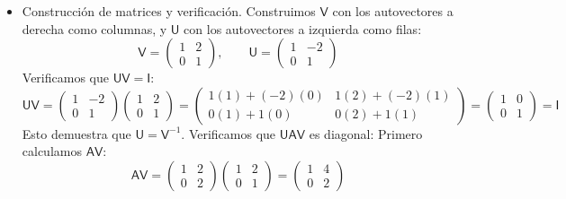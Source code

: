 \documentclass[11pt,spanish]{article}
\newcommand{\mat}[1]{\mathsf{#1}}
\begin{document}
\begin{itemize}
$$$$
Eligiendo $u_x = 1$, obtenemos el autovector a izquierda: $\mat{u}_1 = \begin{pmatrix} 1 & -2 \end{pmatrix}$.
Para $\lambda_2 = 2$:
$$
\begin{pmatrix} u_x & u_y \end{pmatrix} \begin{pmatrix} -1 & 2 \\ 0 & 0 \end{pmatrix} = \begin{pmatrix} 0 & 0 \end{pmatrix} \implies -u_x = 0 \implies u_x = 0
$$
Eligiendo $u_y = 1$, obtenemos el autovector a izquierda: $\mat{u}_2 = \begin{pmatrix} 0 & 1 \end{pmatrix}$.
Nota: Los autovectores a izquierda y derecha asociados a distintos autovalores son ortogonales, y los hemos normalizado de manera tal que $\mat{u}_i \mat{v}_j = \delta_{ij}$. 
Esto nos facilita el siguiente paso.
\item Construcción de matrices y verificación.
Construimos $\mat{V}$ con los autovectores a derecha como columnas, y $\mat{U}$ con los autovectores a izquierda como filas:
$$
\mat{V} = \begin{pmatrix} 1 & 2 \\ 0 & 1 \end{pmatrix}, \qquad \mat{U} = \begin{pmatrix} 1 & -2 \\ 0 & 1 \end{pmatrix}
$$
Verificamos que $\mat{U}\mat{V} = \mat{I}$:
$$
\mat{U}\mat{V} = \begin{pmatrix} 1 & -2 \\ 0 & 1 \end{pmatrix} \begin{pmatrix} 1 & 2 \\ 0 & 1 \end{pmatrix} = \begin{pmatrix} 1(1)+(-2)(0) & 1(2)+(-2)(1) \\ 0(1)+1(0) & 0(2)+1(1) \end{pmatrix} = \begin{pmatrix} 1 & 0 \\ 0 & 1 \end{pmatrix} = \mat{I}
$$
Esto demuestra que $\mat{U} = \mat{V}^{-1}$.
Verificamos que $\mat{U}\mat{A}\mat{V}$ es diagonal: 
Primero calculamos $\mat{A}\mat{V}$:
$$
\mat{A}\mat{V} = \begin{pmatrix} 1 & 2 \\ 0 & 2 \end{pmatrix} \begin{pmatrix} 1 & 2 \\ 0 & 1 \end{pmatrix} = \begin{pmatrix} 1 & 4 \\ 0 & 2 \end{pmatrix}
$$
\end{itemize}
\end{document}
